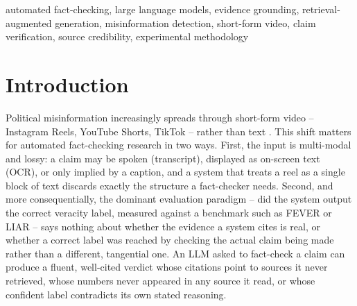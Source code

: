 \documentclass[conference]{IEEEtran}
\begin{document}
\begin{abstract}
prompt-injection defense ($1/5$ pre-fix, $0/5$ post-fix, with the
downstream validator independently neutralizing the pre-fix success), a
newly-found and honestly-unresolved verdict-stage failure
(reliability weighting under direct source contradiction; $0/14$ trials
before and after a targeted fix), and honestly-scoped non-results for
political-bias and calibration questions this data's size cannot yet
support. A 24-entry taxonomy of failure modes surfaced by running the
complete system against real content -- over a third found during the
evaluation program itself, all but three with a deterministic check and a
regression test built from the case that surfaced it -- is as practically
useful a contribution as any single number above. Every number is
reported with its exact sample size and, where a proportion, a Wilson
confidence interval; where an experiment could not be run at a
scientifically meaningful scale, or where our own methodology was found to
be flawed, we say so rather than force or hide it.
\end{abstract}

\begin{IEEEkeywords}
automated fact-checking, large language models, evidence grounding,
retrieval-augmented generation, misinformation detection, short-form video,
claim verification, source credibility, experimental methodology
\end{IEEEkeywords}

\section{Introduction}
\label{sec:introduction}

Political misinformation increasingly spreads through short-form video --
Instagram Reels, YouTube Shorts, TikTok -- rather than text
\cite{shang2021tiktec}. This shift matters for automated fact-checking
research in two ways. First, the input is multi-modal and lossy: a claim
may be spoken (transcript), displayed as on-screen text (OCR), or only
implied by a caption, and a system that treats a reel as a single block
of text discards exactly the structure a fact-checker needs. Second, and
more consequentially, the dominant evaluation paradigm -- did the system
output the correct veracity label, measured against a benchmark such as
FEVER \cite{thorne2018fever} or LIAR \cite{wang2017liar} -- says nothing
about whether the evidence a system cites is real, or whether a correct
label was reached by checking the actual claim being made rather than a
different, tangential one. An LLM asked to fact-check a claim can produce
a fluent, well-cited verdict whose citations point to sources it never
retrieved, whose numbers never appeared in any source it read, or whose
confident label contradicts its own stated reasoning.
\end{document}
